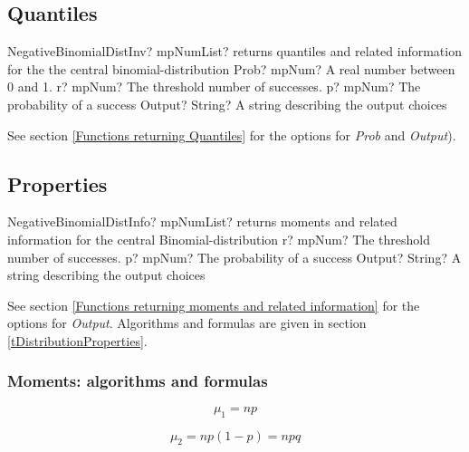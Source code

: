 \subsection{Quantiles}

\begin{mpFunctionsExtract}
	\mpFunctionFour
	{NegativeBinomialDistInv? mpNumList? returns quantiles and related information for the the central binomial-distribution}
	{Prob? mpNum? A real number between 0 and 1.}
	{r? mpNum? The threshold number of successes.}
	{p? mpNum? The probability of a success}
	{Output? String? A string describing the output choices}
\end{mpFunctionsExtract}

\vspace{0.3cm}
See section \ref{Functions returning Quantiles} for the options for  {\itshape\sffamily Prob} and {\itshape\sffamily Output}). 



\subsection{Properties}
\label{NegativBinomialDistributionProperties}


\begin{mpFunctionsExtract}
	\mpFunctionThree
	{NegativeBinomialDistInfo? mpNumList? returns moments and related information for the central Binomial-distribution}
	{r? mpNum? The threshold number of successes.}
	{p? mpNum? The probability of a success}
	{Output? String? A string describing the output choices}
\end{mpFunctionsExtract}

\vspace{0.3cm}

See section \ref{Functions returning moments and related information} for the options for {\itshape\sffamily Output}. Algorithms and formulas are given in section \ref{tDistributionProperties}.



\subsubsection{Moments: algorithms and formulas}

\begin{equation} 
	\mu_1 = np
\end{equation}

\begin{equation} 
	\mu_2 = np(1-p) = npq
\end{equation}

